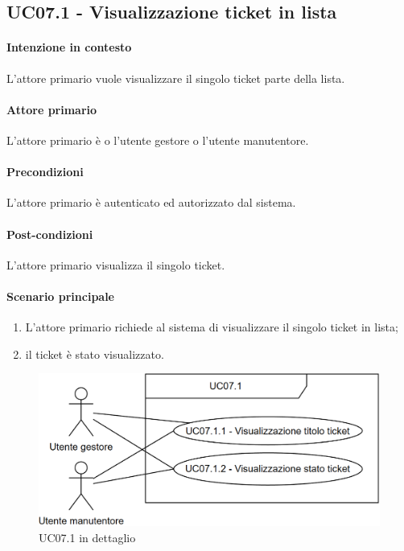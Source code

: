 \subsection{UC07.1 - Visualizzazione ticket in lista}\label{uc:07.1}
\paragraph{Intenzione in contesto} L'attore primario vuole visualizzare il singolo ticket parte della lista.
\paragraph{Attore primario} L'attore primario è o l'utente gestore o l'utente manutentore.
\paragraph{Precondizioni} L'attore primario è autenticato ed autorizzato dal sistema.
\paragraph{Post-condizioni} L'attore primario visualizza il singolo ticket.
\paragraph{Scenario principale}
\begin{enumerate}
    \item L'attore primario richiede al sistema di visualizzare il singolo ticket in lista;
    \item il ticket è stato visualizzato.
\end{enumerate}

\begin{figure}[h]
    \includegraphics[width=\textwidth]{contenuti/img/casi_uso_grafici-uc07.1.png}
    \caption{UC07.1 in dettaglio}
    \label{fig:uc07.1}
\end{figure}

